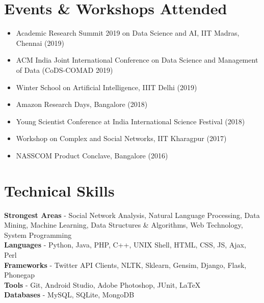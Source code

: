 \documentclass[margin, centered]{res}
\begin{document}
\begin{resume}


\section{Events \& Workshops Attended}
\begin{itemize}[leftmargin=*]
\item Academic Research Summit 2019 on Data Science and AI, IIT Madras, Chennai (2019)
\item ACM India Joint International Conference on Data Science and Management of Data (CoDS-COMAD 2019)
\item Winter School on Artificial Intelligence, IIIT Delhi (2019)
\item Amazon Research Days, Bangalore (2018)
\item Young Scientist Conference at India International Science Festival (2018)
\item Workshop on Complex and Social Networks, IIT Kharagpur (2017)
\item NASSCOM Product Conclave, Bangalore (2016)
\end{itemize}


\section{Technical \hspace{2mm} Skills}
\textbf{Strongest Areas} - Social Network Analysis, Natural Language Processing, Data Mining, Machine Learning, Data Structures \& Algorithms, Web Technology, System Programming \\
\textbf{Languages} - Python, Java, PHP, C++, UNIX Shell, HTML, CSS, JS, Ajax, Perl \\
\textbf{Frameworks} - Twitter API Clients, NLTK, Sklearn, Gensim, Django, Flask, Phonegap \\
\textbf{Tools} - Git, Android Studio, Adobe Photoshop, JUnit, \LaTeX \\
\textbf{Databases} - MySQL, SQLite, MongoDB \\


\end{resume}
\end{document}
